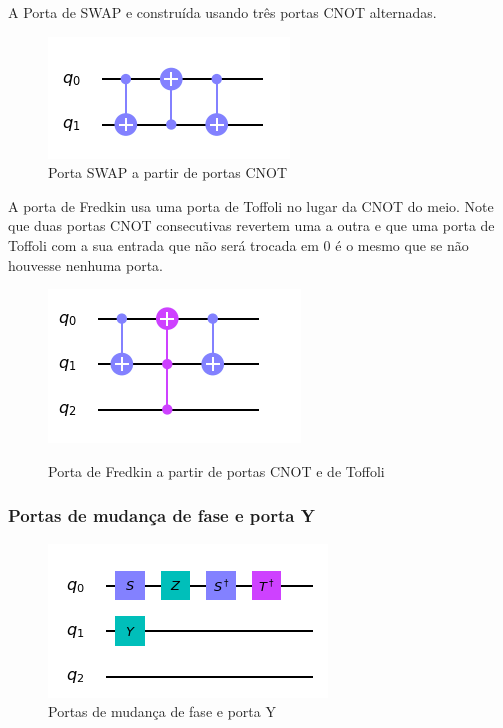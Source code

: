 \documentclass[12pt,a4paper]{article}
\begin{document}
A Porta de SWAP e construída usando três portas CNOT alternadas.


\begin{figure}[h]
    \centering
    \includegraphics{porta_swap.png}
    
        \caption{Porta SWAP a partir de portas CNOT}
    \label{fig:swapconstr}
\end{figure}

A porta de Fredkin usa uma porta de Toffoli no lugar da CNOT do meio. Note que duas portas CNOT consecutivas revertem uma a outra e que uma porta de Toffoli com a sua entrada que não será trocada em 0 é o mesmo que se não houvesse nenhuma porta.

\begin{figure}[h]
    \centering
    \includegraphics{porta_de_fredkin.png}
    \label{fig:Frdconstr}
    
        \caption{Porta de Fredkin a partir de portas CNOT e de Toffoli}
\end{figure}
\subsubsection{Portas  de mudança de fase e porta Y}

\begin{figure}[h!]
    \centering
    \includegraphics{portas_fase.png}
    
        \caption{Portas de mudança de fase e porta Y}
    \label{fig:TFgate}
\end{figure}
\end{document}

